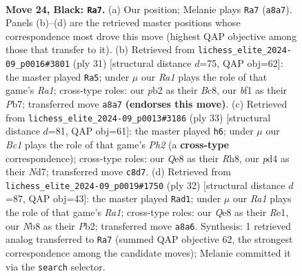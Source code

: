 \documentclass[11pt]{article}
\begin{document}
\clearpage

\begin{figure}[p]\centering
\begin{subfigure}{0.46\textwidth}\centering
\resizebox{\linewidth}{!}{%
\newchessgame
\chessboard[
  setfen={rnb1qr2/1p3k2/2p1p3/p2p1p1p/Pn1P1P2/2N2NP1/1PPQ3P/3R1BKR b - - 2 24},
  showmover=false,
  pgfstyle=straightmove, color=movearrow, markmove={a8-a7}
]}
\caption{}
\end{subfigure}\hfill
\begin{subfigure}{0.46\textwidth}\centering
\resizebox{\linewidth}{!}{%
\newchessgame
\chessboard[
  setfen={r1b2rk1/1p1nqpp1/2n1p2p/2P5/p2pN3/3P1NP1/PPQ2PBP/2R1R1K1 b - - 4 16},
  showmover=false,
  pgfstyle=straightmove, color=movearrow, markmove={a8-a5}
]}
\caption{}
\end{subfigure}
\\[4pt]
\begin{subfigure}{0.46\textwidth}\centering
\resizebox{\linewidth}{!}{%
\newchessgame
\chessboard[
  setfen={4k2r/3nnpbp/rq1pp1p1/p7/Pp1PPB2/5NN1/1P1Q1PPP/R3R1K1 b k - 1 17},
  showmover=false,
  pgfstyle=straightmove, color=movearrow, markmove={h7-h6}
]}
\caption{}
\end{subfigure}\hfill
\begin{subfigure}{0.46\textwidth}\centering
\resizebox{\linewidth}{!}{%
\newchessgame
\chessboard[
  setfen={r1b1rnk1/1pq2p2/2p2npp/p3p3/P3P2N/2P1N1P1/1PQ2PBP/R3R1K1 w - - 0 17},
  showmover=false,
  pgfstyle=straightmove, color=movearrow, markmove={a1-d1}
]}
\caption{}
\end{subfigure}
\caption{\textbf{Move 24, Black: \texttt{Ra7}.} (a) Our position; Melanie plays \texttt{Ra7} (\texttt{a8a7}). Panels (b)--(d) are the retrieved master positions whose correspondence most drove this move (highest QAP objective among those that transfer to it). (b) Retrieved from \texttt{lichess\_elite\_2024-09\_p0016\#3801} (ply 31) [structural distance $d$=75, QAP obj=62]: the master played \texttt{Ra5}; under $\mu$ our \emph{Ra1} plays the role of that game's \emph{Ra1}; cross-type roles: our \emph{p}b2 as their \emph{B}c8, our \emph{b}f1 as their \emph{P}b7; transferred move \texttt{a8a7} \textbf{(endorses this move)}. (c) Retrieved from \texttt{lichess\_elite\_2024-09\_p0013\#3186} (ply 33) [structural distance $d$=81, QAP obj=61]: the master played \texttt{h6}; under $\mu$ our \emph{Bc1} plays the role of that game's \emph{Ph2} (a \textbf{cross-type} correspondence); cross-type roles: our \emph{Q}e8 as their \emph{R}h8, our \emph{p}d4 as their \emph{N}d7; transferred move \texttt{c8d7}. (d) Retrieved from \texttt{lichess\_elite\_2024-09\_p0019\#1750} (ply 32) [structural distance $d$=87, QAP obj=43]: the master played \texttt{Rad1}; under $\mu$ our \emph{Ra1} plays the role of that game's \emph{Ra1}; cross-type roles: our \emph{Q}e8 as their \emph{R}e1, our \emph{N}b8 as their \emph{P}b2; transferred move \texttt{a8a6}. Synthesis: 1 retrieved analog transferred to \texttt{Ra7} (summed QAP objective 62, the strongest correspondence among the candidate moves); Melanie committed it via the \texttt{search} selector.}
\label{fig:thought-m47}
\end{figure}
\end{document}

